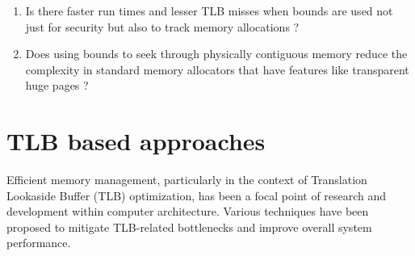 \begin{enumerate}
    \item Is there faster run times and lesser TLB misses when bounds are used not just for security but
    also to track memory allocations ? 
    \item Does using bounds to seek through physically contiguous memory reduce the complexity in standard 
    memory allocators that have features like transparent huge pages ?
  \end{enumerate}

\section{TLB based approaches}
Efficient memory management, particularly in the context of 
Translation Lookaside Buffer (TLB) optimization, has been a focal point of 
research and development within computer architecture. Various techniques have been 
proposed to mitigate TLB-related bottlenecks and improve overall system performance.

